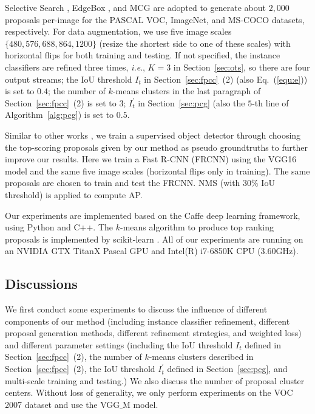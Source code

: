 \documentclass[10pt,journal,compsoc]{IEEEtran}
\def\ie{\emph{i.e}.} \def\Ie{\emph{I.e}.}
\begin{document}
Selective Search \cite{Ref:Uijlings2013}, EdgeBox \cite{Ref:Zitnick2014}, and MCG \cite{Ref:Pont2017} are adopted to generate about $2,000$ proposals per-image for the PASCAL VOC, ImageNet, and MS-COCO datasets, respectively.
For data augmentation, we use five image scales $\{480, 576, 688, 864, 1200\}$ (resize the shortest side to one of these scales) with horizontal flips for both training and testing.
If not specified,
the instance classifiers are refined three times,
\ie, $K=3$ in Section~\ref{sec:ots},
so there are four output streams;
the IoU threshold $I_{t}$ in Section~\ref{sec:fpcc}~(2) (also Eq.~(\ref{equ:e})) is set to $0.4$;
the number of $k$-means clusters in the last paragraph of Section~\ref{sec:fpcc}~(2) is set to $3$;
$I^{\prime}_{t}$ in Section~\ref{sec:pcg} (also the $5$-th line of Algorithm~\ref{alg:pcg}) is set to $0.5$.

Similar to other works \cite{Ref:Li2016,Ref:Diba2017,Ref:Jie2017},
we train a supervised object detector through choosing the top-scoring proposals given by our method as pseudo groundtruths to further improve our results.
Here we train a Fast R-CNN (FRCNN) \cite{Ref:Girshick2015} using the VGG16 model and the same five image scales (horizontal flips only in training).
The same proposals are chosen to train and test the FRCNN.
NMS (with $30\%$ IoU threshold) is applied to compute AP.

Our experiments are implemented based on the Caffe \cite{Ref:Jia2014} deep learning framework, using Python and C++.
The $k$-means algorithm to produce top ranking proposals is implemented by scikit-learn \cite{Ref:Pedregosa2011}.
All of our experiments are running on an NVIDIA GTX TitanX Pascal GPU
and Intel(R) i7-6850K CPU (3.60GHz).




\subsection{Discussions}
\label{sec:abl_exp}

We first conduct some experiments
to discuss the influence of different components of our method
(including instance classifier refinement,
different proposal generation methods,
different refinement strategies,
and weighted loss)
and different parameter settings
(including the IoU threshold $I_{t}$ defined in Section~\ref{sec:fpcc}~(2),
the number of $k$-means clusters described in Section~\ref{sec:fpcc}~(2),
the IoU threshold $I^{\prime}_{t}$ defined in Section~\ref{sec:pcg},
{and multi-scale training and testing}.)
{We also discuss the number of proposal cluster centers.}
Without loss of generality, we only perform experiments on the VOC 2007 dataset and use the VGG$\_$M model.
\end{document}
